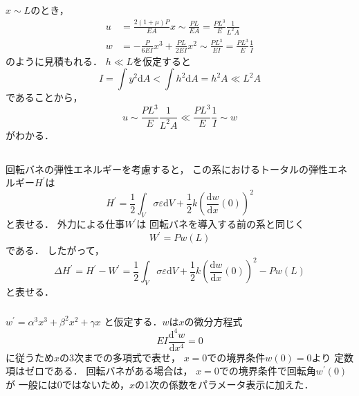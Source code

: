 \documentclass[a4paper]{jsarticle}
\begin{document}
\subsubsection{}
$x \sim L$のとき，
\begin{align}
  u & = \frac{2 (1 + \mu)P}{EA} x  \sim \frac{PL}{EA} =
  \frac{PL^3}{E} \frac{1}{L^2 A}                                               \\
  w & = -\frac{P}{6 E I} x^3 + \frac{P L}{2 E I} x^2  \sim \frac{P L^3}{E I} =
  \frac{P L^3}{E} \frac{1}{I}
\end{align}
のように見積もれる．
$h \ll L$を仮定すると
\begin{equation}
  I = \int y^2 \mathrm{d} A < \int h^2 \mathrm{d} A = h^2 A \ll L^2 A
\end{equation}
であることから，
\begin{equation}
  u \sim \frac{P L^3}{E} \frac{1}{L^2 A} \ll \frac{P L^3}{E} \frac{1}{I} \sim w
\end{equation}
がわかる．

\subsection{}
\subsubsection{}
回転バネの弾性エネルギーを考慮すると，
この系におけるトータルの弾性エネルギー$H^{\prime}$は
\begin{equation}
  H^{\prime} = \frac{1}{2}\int_V \sigma \varepsilon \mathrm{d} V
  + \frac{1}{2} k \left(\frac{\mathrm{d} w}{\mathrm{d} x}(0)\right)^2
\end{equation}
と表せる．
外力による仕事$W^{\prime}$は
回転バネを導入する前の系と同じく
\begin{equation}
  W^{\prime} = P w(L)
\end{equation}
である．
したがって，
\begin{equation}
  \Delta H^{\prime} = H^{\prime} - W^{\prime} =
  \frac{1}{2}\int_V \sigma \varepsilon \mathrm{d} V
  + \frac{1}{2} k \left(\frac{\mathrm{d} w}{\mathrm{d} x}(0)\right)^2
  - P w(L)
\end{equation}
と表せる．

\subsubsection{}
$w^{\prime} = \alpha^3 x^3 + \beta^2 x^2 + \gamma x$
と仮定する．$w$は$x$の微分方程式
\begin{equation}
  E I \frac{\mathrm{d}^4 w}{\mathrm{d} x^4} = 0
\end{equation}
に従うため$x$の3次までの多項式で表せ，
$x = 0$での境界条件$w(0) = 0$より
定数項はゼロである．
回転バネがある場合は，
$x = 0$での境界条件で回転角$w^{\prime}(0)$が
一般には0ではないため，$x$の1次の係数をパラメータ表示に加えた．
\end{document}
